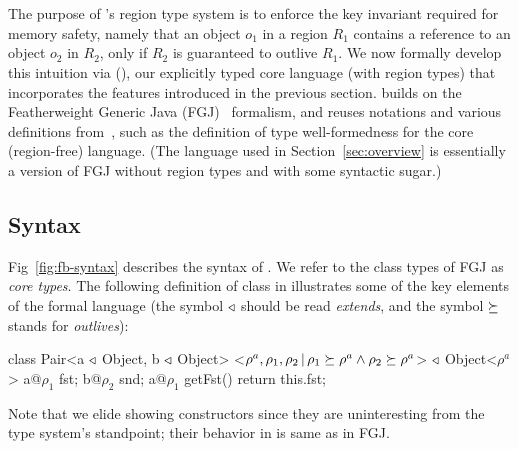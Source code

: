 \section{\fbname}
\label{sec:type-system}

The purpose of \name's region type system is to enforce the key
invariant required for memory safety, namely that an object $o_1$ in a
region $R_1$ contains a reference to an object $o_2$ in $R_2$, only if
$R_2$ is guaranteed to outlive $R_1$.  We now formally develop this
intuition via \fbname (\FB), our explicitly typed core language (with
region types) that incorporates the features introduced in the
previous section. \fbname builds on the Featherweight Generic Java
(FGJ)~\cite{fgj} formalism, and reuses notations and various
definitions from~\cite{fgj}, such as the definition of type
well-formedness for the core (region-free) language.  (The language
used in Section~\ref{sec:overview} is essentially a version of FGJ
without region types and with some syntactic sugar.)


\subsection{Syntax}
\label{sec:fb-syntax}

Fig~\ref{fig:fb-syntax} describes the syntax of \FB.
We refer to the class types of FGJ as \emph{core types}.
%
The following definition of  class in \FB illustrates some of
the key elements of the formal language (the symbol $\triangleleft$ should
be read \emph{extends}, and the symbol $\succeq$ stands for
\emph{outlives}):
\begin{codejava}[mathescape=true]
class Pair<a $\triangleleft$ Object, b $\triangleleft$ Object>
          <$\rho^a, \rho_1, \rho_2 \,|\, \rho_1 \succeq \rho^a \wedge \rho_2 \succeq \rho^a$> $\triangleleft$ Object<$\rho^a$> {
  a@$\rho_1$ fst; 
  b@$\rho_2$ snd;
  a@$\rho_1$ getFst() { 
    return this.fst; 
  }
}
\end{codejava}
Note that we elide showing constructors since they are uninteresting
from the type system's standpoint; their behavior in \FB is same as in
FGJ. 

